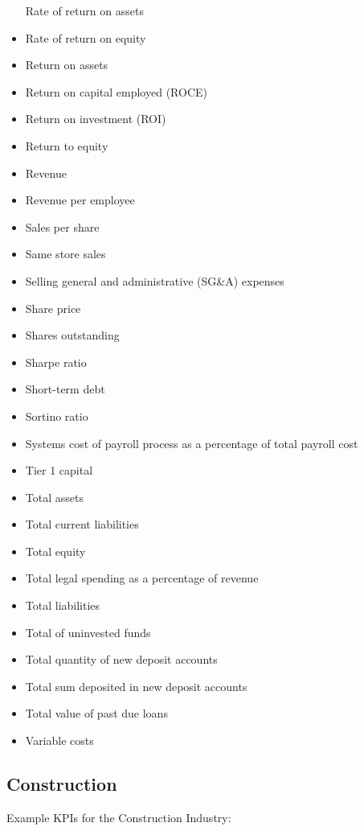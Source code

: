 \documentclass[]{book}
\begin{document}
\begin{itemize}
  Rate of return on assets
\item
  Rate of return on equity
\item
  Return on assets
\item
  Return on capital employed (ROCE)
\item
  Return on investment (ROI)
\item
  Return to equity
\item
  Revenue
\item
  Revenue per employee
\item
  Sales per share
\item
  Same store sales
\item
  Selling general and administrative (SG\&A) expenses
\item
  Share price
\item
  Shares outstanding
\item
  Sharpe ratio
\item
  Short-term debt
\item
  Sortino ratio
\item
  Systems cost of payroll process as a percentage of total payroll cost
\item
  Tier 1 capital
\item
  Total assets
\item
  Total current liabilities
\item
  Total equity
\item
  Total legal spending as a percentage of revenue
\item
  Total liabilities
\item
  Total of uninvested funds
\item
  Total quantity of new deposit accounts
\item
  Total sum deposited in new deposit accounts
\item
  Total value of past due loans
\item
  Variable costs
\end{itemize}

\subsection{Construction}\label{construction}

Example KPIs for the Construction Industry:
\end{document}
